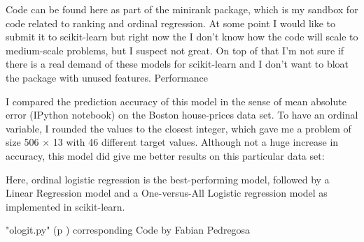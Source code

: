 Code can be found here as part of the minirank package, which is my sandbox for code related to ranking and ordinal regression. At some point I would like to submit it to scikit-learn but right now the I don't know how the code will scale to medium-scale problems, but I suspect not great. On top of that I'm not sure if there is a real demand of these models for scikit-learn and I don't want to bloat the package with unused features.
Performance

I compared the prediction accuracy of this model in the sense of mean absolute error (IPython notebook) on the Boston house-prices data set. To have an ordinal variable, I rounded the values to the closest integer, which gave me a problem of size 506 × 13 with 46 different target values. Although not a huge increase in accuracy, this model did give me better results on this particular data set:

Here, ordinal logistic regression is the best-performing model, followed by a Linear Regression model and a One-versus-All Logistic regression model as implemented in scikit-learn.

\PyImg "ologit.py" (p \pageref{py:ologit}) corresponding Code by Fabian Pedregosa
